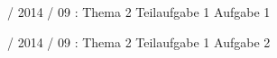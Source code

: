 \documentclass{lehramt-informatik-haupt}
\begin{document}
%

 / 2014 / 09 : Thema 2 Teilaufgabe 1 Aufgabe 1

%

 / 2014 / 09 : Thema 2 Teilaufgabe 1 Aufgabe 2

\literatur
\end{document}

